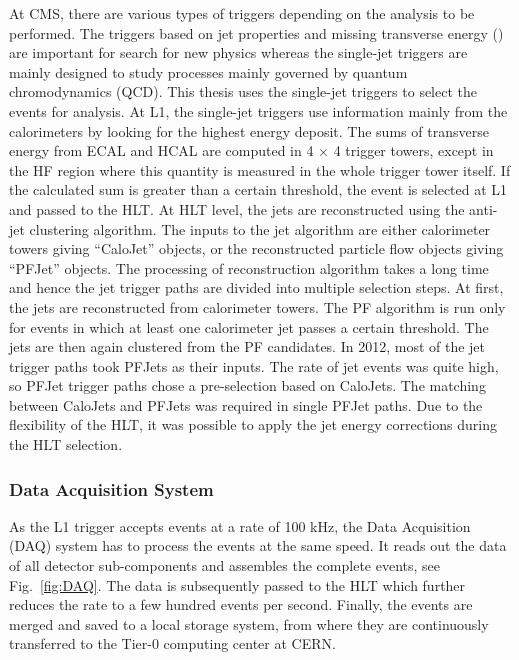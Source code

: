 At CMS, there are various types of triggers depending on the analysis to be performed. The triggers based on jet properties and missing transverse energy (\ETmiss) are important for search for new physics whereas the single-jet triggers are mainly designed to study processes mainly governed by quantum chromodynamics (QCD). This thesis uses the single-jet triggers to select the events for analysis. At L1, the single-jet triggers use information mainly from the calorimeters by looking for the highest energy deposit. The sums of transverse energy from ECAL and HCAL are computed in 4 $\times$ 4 trigger towers, except in the HF region where this quantity is measured in the whole trigger tower itself. If the calculated sum is greater than a certain threshold, the event is selected at L1 and passed to the HLT. At HLT level, the jets are reconstructed using the anti-\kt jet clustering algorithm. The inputs to the jet algorithm are either calorimeter towers giving ``CaloJet'' objects, or the reconstructed particle flow objects giving ``PFJet'' objects. The processing of reconstruction algorithm takes a long time and hence the jet trigger paths are divided into multiple selection steps. At first, the jets are reconstructed from calorimeter towers. The PF algorithm is run only for events in which at least one calorimeter jet passes a certain \pt threshold. The jets are then again clustered from the PF candidates. In 2012, most of the jet trigger paths took PFJets as their inputs. The rate of jet events was quite high, so PFJet trigger paths chose a pre-selection based on CaloJets. The matching between CaloJets and PFJets was required in single PFJet paths. Due to the flexibility of the HLT, it was possible to apply the jet energy corrections during the HLT selection.

\subsubsection{Data Acquisition System}
As the L1 trigger accepts events at a rate of 100 kHz, the Data Acquisition (DAQ) system has to process the events at the same speed. It reads out the data of all detector sub-components and assembles the complete events, see Fig.~\ref{fig:DAQ}. The data is subsequently passed to the HLT which further reduces the rate to a few hundred events per second. Finally, the events are merged and saved to a local storage system, from where they are continuously transferred to the Tier-0 computing center at CERN.

